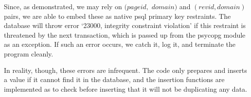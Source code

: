 Since, as demonstrated, we may rely on $(pageid,$ $domain)$ and
$(revid,domain)$ pairs, we are able to embed these as native psql
primary key restraints. The database will throw error `23000,
integrity constraint violation' if this restraint is threatened by the
next transaction, which is passed up from the psycopg module as an
exception.\cite{psql-error}\cite{psyc-error} If such an error occurs,
we catch it, log it, and terminate the program cleanly.

In reality, though, these errors are infrequent. The code only
prepares and inserts a value if it cannot find it in the database, and
the insertion functions are implemented as to check before inserting
that it will not be duplicating any data.
